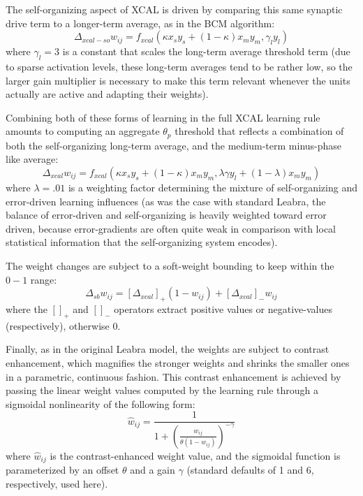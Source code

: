 \documentclass[10pt,letterpaper]{article}
\newcommand{\wij}{w_{ij}}
\newcommand{\oneo}[1]{\frac{1}{#1}}
\numberwithin{equation}{section}
\begin{document}
The self-organizing aspect of XCAL is driven by comparing this same synaptic
drive term to a longer-term average, as in the BCM algorithm:
\begin{equation}
 \Delta_{xcal-so} \wij = f_{xcal} ( \kappa x_s y_s + (1-\kappa) x_m y_m, \gamma_l y_l)
 \label{eq.xcal-selforg}
\end{equation}
where $\gamma_l = 3$ is a constant that scales the long-term average threshold
term (due to sparse activation levels, these long-term averages tend to be
rather low, so the larger gain multiplier is necessary to make this term
relevant whenever the units actually are active and adapting their weights).

Combining both of these forms of learning in the full XCAL learning rule
amounts to computing an aggregate $\theta_p$ threshold that reflects a
combination of both the self-organizing long-term average, and the medium-term
minus-phase like average:
\begin{equation}
 \Delta_{xcal} \wij = f_{xcal} ( \kappa x_s y_s + (1-\kappa) x_m y_m, \lambda
 \gamma y_l + (1-\lambda) x_m y_m)
 \label{eq.xcal}
\end{equation}
where $\lambda = .01$ is a weighting factor determining the mixture of
self-organizing and error-driven learning influences (as was the case with
standard Leabra, the balance of error-driven and self-organizing is heavily
weighted toward error driven, because error-gradients are often quite weak in
comparison with local statistical information that the self-organizing system
encodes).

The weight changes are subject to a soft-weight bounding to keep within the $0-1$
range:
\begin{equation}
 \Delta_{sb} \wij = [\Delta_{xcal}]_+ (1-\wij) + [\Delta_{xcal}]_- \wij
 \label{eq.err_soft_bound}
\end{equation}
where the $[]_+$ and $[]_-$ operators extract positive values or
negative-values (respectively), otherwise 0.

Finally, as in the original Leabra model, the weights are subject to contrast
enhancement, which magnifies the stronger weights and shrinks the smaller ones
in a parametric, continuous fashion. This contrast enhancement is achieved by
passing the linear weight values computed by the learning rule through a
sigmoidal nonlinearity of the following form:
\begin{equation}
 \hat{w}_{ij} = \oneo{1 + \left(\frac{\wij}{\theta (1-\wij)}\right)^{-\gamma}}
 \label{eq.wt_off}
\end{equation}
where $\hat{w}_{ij}$ is the contrast-enhanced weight value, and the
sigmoidal function is parameterized by an offset $\theta$ and a gain
$\gamma$ (standard defaults of 1 and 6, respectively, used here). 
\end{document}
